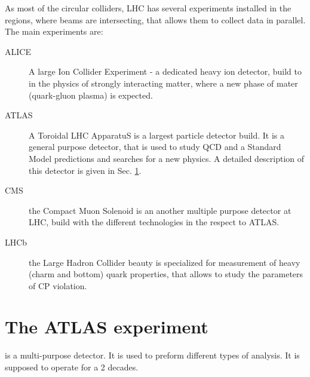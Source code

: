 As most of the circular colliders, LHC has several experiments installed in the regions, where beams are intersecting, that allows them to collect data in parallel. The main experiments are:
\begin{description}
\item [ALICE] A large Ion Collider Experiment - a dedicated heavy ion detector, build to in the physics of strongly interacting matter, where a new phase of mater (quark-gluon plasma) is expected.
\item [ATLAS] A Toroidal LHC ApparatuS  is a largest particle detector build. It is a general purpose detector, that is used to study QCD and a Standard Model predictions and searches for a new physics. A detailed description of this detector is given in Sec. \ref{sec:ATLAS}.
\item [CMS] the Compact Muon Solenoid is an another multiple purpose detector at LHC, build with the different technologies in the respect to ATLAS.
\item [LHCb] the Large Hadron Collider beauty is specialized for measurement of heavy (charm and bottom) quark properties, that allows to study the parameters of CP violation.
\end{description}


\begin{figure}[!b]
\end{figure}

\section{The ATLAS experiment} \label{sec:ATLAS}

\begin{figure}[!tbp]
\end{figure}
\atlas is a multi-purpose detector. It is used to preform different types of analysis. It is supposed to operate for a 2 decades. 

